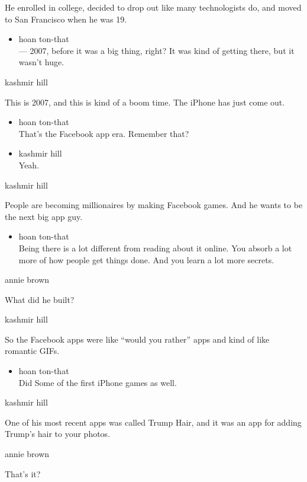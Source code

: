 He enrolled in college, decided to drop out like many technologists do,
and moved to San Francisco when he was 19.

\begin{itemize}
\tightlist
\item
  hoan ton-that\\
  --- 2007, before it was a big thing, right? It was kind of getting
  there, but it wasn't huge.
\end{itemize}

kashmir hill

This is 2007, and this is kind of a boom time. The iPhone has just come
out.

\begin{itemize}
\item
  hoan ton-that\\
  That's the Facebook app era. Remember that?
\item
  kashmir hill\\
  Yeah.
\end{itemize}

kashmir hill

People are becoming millionaires by making Facebook games. And he wants
to be the next big app guy.

\begin{itemize}
\tightlist
\item
  hoan ton-that\\
  Being there is a lot different from reading about it online. You
  absorb a lot more of how people get things done. And you learn a lot
  more secrets.
\end{itemize}

annie brown

What did he built?

kashmir hill

So the Facebook apps were like ``would you rather'' apps and kind of
like romantic GIFs.

\begin{itemize}
\tightlist
\item
  hoan ton-that\\
  Did Some of the first iPhone games as well.
\end{itemize}

kashmir hill

One of his most recent apps was called Trump Hair, and it was an app for
adding Trump's hair to your photos.

annie brown

That's it?


